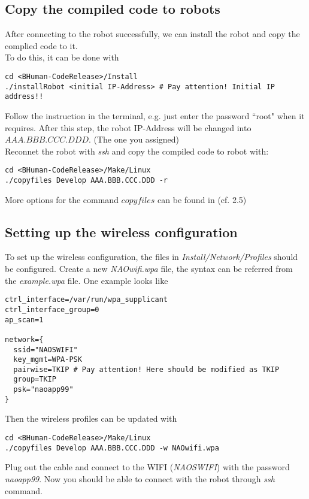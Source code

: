\documentclass[a4paper]{article}
\begin{document}
\subsection{Copy the compiled code to robots}
After connecting to the robot successfully, we can install the robot and copy the complied code to it.\\ 
To do this, it can be done with
\begin{lstlisting}
cd <BHuman-CodeRelease>/Install
./installRobot <initial IP-Address> # Pay attention! Initial IP address!!
\end{lstlisting}
Follow the instruction in the terminal, e.g. just enter the password ``root" when it requires.
After this step, the robot IP-Address will be changed into $AAA.BBB.CCC.DDD$. (The one you assigned)\\
Reconnet the robot with \emph{ssh} and copy the compiled code to robot with:
\begin{lstlisting}
cd <BHuman-CodeRelease>/Make/Linux
./copyfiles Develop AAA.BBB.CCC.DDD -r
\end{lstlisting}
More options for the command $copyfiles$ can be found in \cite{BHuman2015}(cf. 2.5)
\subsection{Setting up the wireless configuration}
To set up the wireless configuration, the files in \emph{Install/Network/Profiles} should be configured. Create  a new \emph{NAOwifi.wpa} file, the syntax can be referred from the \emph{example.wpa} file. One example looks like
\begin{lstlisting}
ctrl_interface=/var/run/wpa_supplicant
ctrl_interface_group=0
ap_scan=1

network={
  ssid="NAOSWIFI"
  key_mgmt=WPA-PSK
  pairwise=TKIP # Pay attention! Here should be modified as TKIP
  group=TKIP
  psk="naoapp99"
}

\end{lstlisting}
Then the wireless profiles can be updated with 
\begin{lstlisting}
cd <BHuman-CodeRelease>/Make/Linux
./copyfiles Develop AAA.BBB.CCC.DDD -w NAOwifi.wpa
\end{lstlisting}
Plug out the cable and connect to the WIFI (\emph{NAOSWIFI}) with the password \emph{naoapp99}. Now you should be able to connect with the robot through \emph{ssh} command.
\clearpage
\end{document}
